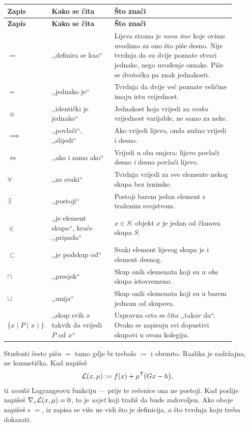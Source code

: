 \begin{longtable}{@{}p{0.13\linewidth} p{0.27\linewidth} p{0.52\linewidth}@{}}
\toprule
\textbf{Zapis} & \textbf{Kako se čita} & \textbf{Što znači} \\
\midrule
\endfirsthead
\toprule
\textbf{Zapis} & \textbf{Kako se čita} & \textbf{Što znači} \\
\midrule
\endhead
$\coloneqq$ & ,,definira se kao`` & Lijeva strana je \emph{novo ime} koje ovime uvodimo za ono što piše desno. Nije tvrdnja da su dvije poznate stvari jednake, nego uvođenje oznake. Piše se dvotočka pa znak jednakosti. \\[4pt]
$=$ & ,,jednako je`` & Tvrdnja da dvije već poznate veličine imaju istu vrijednost. \\[4pt]
$\equiv$ & ,,identički je jednako`` & Jednakost koja vrijedi za \emph{svaku} vrijednost varijable, ne samo za neke. \\[4pt]
$\implies$ & ,,povlači``, ,,slijedi`` & Ako vrijedi lijevo, onda nužno vrijedi i desno. \\[4pt]
$\iff$ & ,,ako i samo ako`` & Vrijedi u oba smjera: lijevo povlači desno \emph{i} desno povlači lijevo. \\[4pt]
$\forall$ & ,,za svaki`` & Tvrdnja vrijedi za sve elemente nekog skupa bez iznimke. \\[4pt]
$\exists$ & ,,postoji`` & Postoji barem jedan element s traženim svojstvom. \\[4pt]
$\in$ & ,,je element skupa``, kraće ,,pripada`` & $x \in S$: objekt $x$ je jedan od članova skupa $S$. \\[4pt]
$\subset$ & ,,je podskup od`` & Svaki element lijevog skupa je i element desnog. \\[4pt]
$\cap$ & ,,presjek`` & Skup onih elemenata koji su u \emph{oba} skupa istovremeno. \\[4pt]
$\cup$ & ,,unija`` & Skup onih elemenata koji su u barem jednom od skupova. \\[4pt]
$\{x \mid P(x)\}$ & ,,skup svih $x$ takvih da vrijedi $P$ od $x$`` & Uspravna crta se čita ,,takav da``. Ovako se zapisuju svi dopustivi skupovi u ovom kolegiju. \\
\bottomrule
\end{longtable}

\begin{zamka}[Zamka: $\coloneqq$ nasuprot $=$]
Studenti često pišu $=$ tamo gdje bi trebalo $\coloneqq$ i obrnuto. Razlika je
sadržajna, ne kozmetička. Kad napišeš
\[
\mathcal{L}(x,\mu) \mathrel{\vcentcolon=} f(x) + \mu^{\mathsf{T}}\bigl(Gx - h\bigr),
\]
ti \emph{uvodiš} Lagrangeovu funkciju --- prije te rečenice ona ne postoji. Kad
poslije napišeš $\nabla_x \mathcal{L}(x,\mu) = 0$, to je \emph{uvjet} koji tražiš da bude
zadovoljen. Ako oboje napišeš s $=$, iz zapisa se više ne vidi što je definicija,
a što tvrdnja koju treba dokazati.
\end{zamka}

